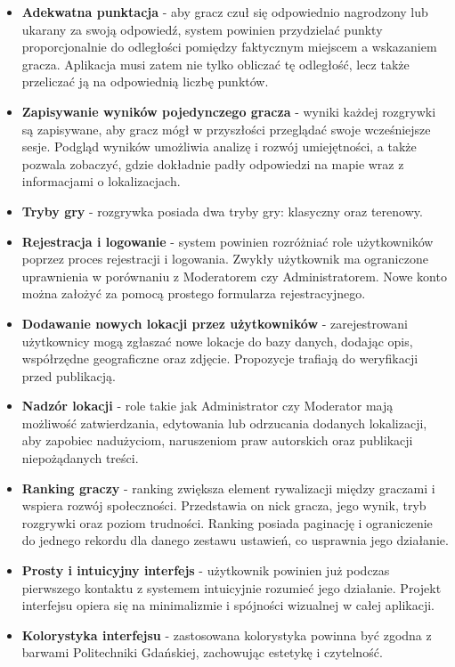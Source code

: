 \begin{itemize}
    \item \textbf{Adekwatna punktacja} - aby gracz czuł się odpowiednio nagrodzony lub ukarany za swoją odpowiedź, system powinien przydzielać punkty proporcjonalnie do odległości pomiędzy faktycznym miejscem a wskazaniem gracza. Aplikacja musi zatem nie tylko obliczać tę odległość, lecz także przeliczać ją na odpowiednią liczbę punktów.
    \item \textbf{Zapisywanie wyników pojedynczego gracza} - wyniki każdej rozgrywki są zapisywane, aby gracz mógł w przyszłości przeglądać swoje wcześniejsze sesje. Podgląd wyników umożliwia analizę i rozwój umiejętności, a także pozwala zobaczyć, gdzie dokładnie padły odpowiedzi na mapie wraz z informacjami o lokalizacjach.
    \item \textbf{Tryby gry} - rozgrywka posiada dwa tryby gry: klasyczny oraz terenowy.
    \item \textbf{Rejestracja i logowanie} - system powinien rozróżniać role użytkowników poprzez proces rejestracji i logowania. Zwykły użytkownik ma ograniczone uprawnienia w porównaniu z Moderatorem czy Administratorem. Nowe konto można założyć za pomocą prostego formularza rejestracyjnego.
    \item \textbf{Dodawanie nowych lokacji przez użytkowników} - zarejestrowani użytkownicy mogą zgłaszać nowe lokacje do bazy danych, dodając opis, współrzędne geograficzne oraz zdjęcie. Propozycje trafiają do weryfikacji przed publikacją.
    \item \textbf{Nadzór lokacji} - role takie jak Administrator czy Moderator mają możliwość zatwierdzania, edytowania lub odrzucania dodanych lokalizacji, aby zapobiec nadużyciom, naruszeniom praw autorskich oraz publikacji niepożądanych treści.
    \item \textbf{Ranking graczy} - ranking zwiększa element rywalizacji między graczami i wspiera rozwój społeczności. Przedstawia on nick gracza, jego wynik, tryb rozgrywki oraz poziom trudności. Ranking posiada paginację i ograniczenie do jednego rekordu dla danego zestawu ustawień, co usprawnia jego działanie.
    \item \textbf{Prosty i intuicyjny interfejs} - użytkownik powinien już podczas pierwszego kontaktu z systemem intuicyjnie rozumieć jego działanie. Projekt interfejsu opiera się na minimalizmie i spójności wizualnej w całej aplikacji.
    \item \textbf{Kolorystyka interfejsu} - zastosowana kolorystyka powinna być zgodna z barwami Politechniki Gdańskiej, zachowując estetykę i czytelność.

\end{itemize}
